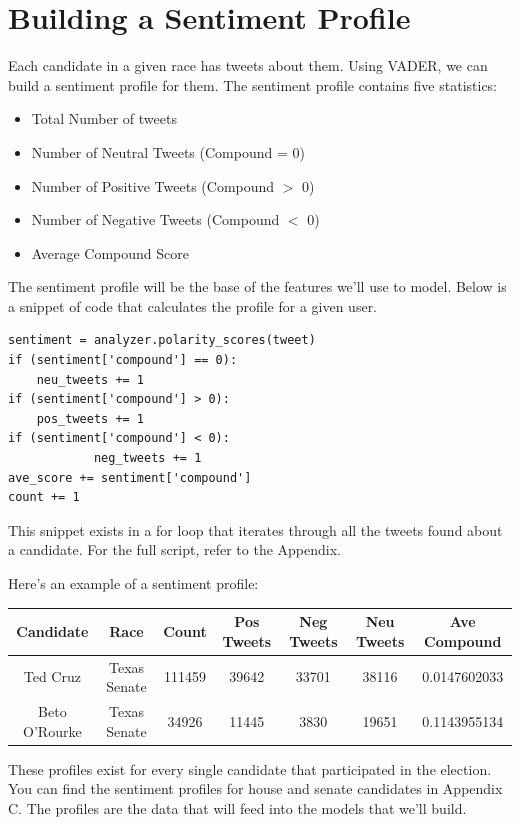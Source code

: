 \documentclass[11pt, twoside, reqno]{book}
\begin{document}
\section{Building a Sentiment Profile}
Each candidate in a given race has tweets about them. Using VADER, we can build a sentiment profile for them. The sentiment profile contains five statistics:
\begin{itemize}
	\item Total Number of tweets
	\item Number of Neutral Tweets (Compound = 0)
	\item Number of Positive Tweets (Compound $>$ 0)
	\item Number of Negative Tweets (Compound $<$ 0)
	\item Average Compound Score
\end{itemize}
The sentiment profile will be the base of the features we'll use to model. Below is a snippet of code that calculates the profile for a given user.
\begin{verbatim}
sentiment = analyzer.polarity_scores(tweet) 
if (sentiment['compound'] == 0):        
	neu_tweets += 1          
if (sentiment['compound'] > 0):        
	pos_tweets += 1            
if (sentiment['compound'] < 0):
        	neg_tweets += 1
ave_score += sentiment['compound']
count += 1
\end{verbatim}
This snippet exists in a for loop that iterates through all the tweets found about a candidate. For the full script, refer to the Appendix. 

Here's an example of a sentiment profile:
\begin{center}
\begin{tabular}{ |c|c|c|c|c|c|c|} 
	\hline
	Candidate & Race & Count & Pos Tweets & Neg Tweets & Neu Tweets & Ave Compound\\
 	\hline 
	Ted Cruz & Texas Senate & 111459 & 39642 & 33701 & 38116 & 0.0147602033 \\
  	\hline
	Beto O'Rourke & Texas Senate & 34926 & 11445 & 3830 & 19651 & 0.1143955134 \\ 
	\hline
\end{tabular}
\end{center}
These profiles exist for every single candidate that participated in the election. You can find the sentiment profiles for house and senate candidates in Appendix C. The profiles are the data that will feed into the models that we'll build. 



\end{document}
